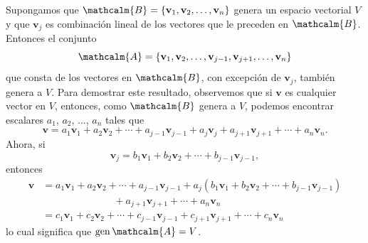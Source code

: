 Supongamos que $\mathcalm{B} = \{\mathbf{v}_1, \mathbf{v}_2, \dots, \mathbf{v}_n\}$ genera un espacio vectorial $V$ y que $\mathbf{v}_j$ es combinación lineal de los vectores que le preceden en $\mathcalm{B}$. Entonces el conjunto
$$\mathcalm{A} = \{\mathbf{v}_1, \mathbf{v}_2, \dots, \mathbf{v}_{j-1}, \mathbf{v}_{j+1}, \dots, \mathbf{v}_n\}$$
que consta de los vectores en $\mathcalm{B}$, con excepción de $\mathbf{v}_j$, también genera a $V$. Para demostrar este resultado, observemos que si $\mathbf{v}$ es cualquier vector en $V$, entonces, como $\mathcalm{B}$ genera a $V$, podemos encontrar escalares $a_1$, $a_2$, $\dots$, $a_n$ tales que
$$\mathbf{v} = a_1 \mathbf{v}_1 + a_2 \mathbf{v}_2 + \cdots + a_{j-1} \mathbf{v}_{j-1} + a_j \mathbf{v}_j + a_{j+1} \mathbf{v}_{j+1} + \cdots + a_n \mathbf{v}_n.$$
Ahora, si
$$\mathbf{v}_j = b_1 \mathbf{v}_1 + b_2 \mathbf{v}_2 + \cdots + b_{j-1} \mathbf{v}_{j-1},$$
entonces
\begin{align*}
    \mathbf{v} & = a_1 \mathbf{v}_1 + a_2 \mathbf{v}_2 + \cdots + a_{j-1} \mathbf{v}_{j-1} + a_j (b_1 \mathbf{v}_1 + b_2 \mathbf{v}_2 + \cdots + b_{j-1} \mathbf{v}_{j-1}) \\
    & \hspace{3cm} + a_{j+1} \mathbf{v}_{j+1} + \cdots + a_n \mathbf{v}_n \\
    & = c_1 \mathbf{v}_1 + c_2 \mathbf{v}_2 + \cdots + c_{j-1} \mathbf{v}_{j-1} + c_{j+1} \mathbf{v}_{j+1} + \cdots + c_n \mathbf{v}_n
\end{align*}
lo cual significa que $\Gen \mathcalm{A} = V$.

